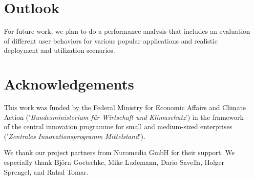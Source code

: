 \documentclass[runningheads]{llncs}
\begin{document}
\section{Outlook}
\label{sec:NextSteps}

For future work, we plan to do a performance analysis that includes an evaluation of different user behaviors for various popular applications and realistic deployment and utilization scenarios.


\section*{Acknowledgements}

This work was funded by the Federal Ministry for Economic Affairs and Climate Action
('\textsl{Bundesministerium f\"ur Wirtschaft und Klimaschutz}')
in the framework of the central innovation programme
for small and medium-sized enterprises
('\textsl{Zentrales Innovationsprogramm Mittelstand}').

We thank our project partners from Nuromedia GmbH for their support.
We especially thank Björn Goetschke, Mike Ludemann, Dario Savella, Holger Sprengel, and Rahul Tomar.



%
%


%

\end{document}
